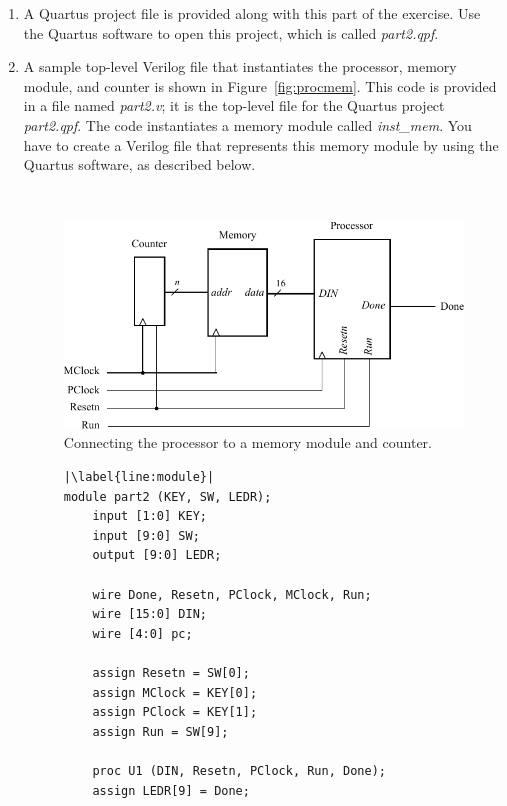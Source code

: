 \documentclass[epsfig,10pt,fullpage]{article}
\begin{document}
\begin{enumerate}
\item A Quartus project file is provided along with this part of the exercise.  Use the 
Quartus software to open this project, which is called {\it part2.qpf}.
\item A sample top-level Verilog file that instantiates the processor, memory module, and
counter is shown in Figure~\ref{fig:procmem}. This code is provided in a file named
{\it part2.v}; it is the top-level file for the Quartus project {\it part2.qpf}. The 
code instantiates a memory module called {\it inst\_mem}. You have to create a Verilog file
that represents this memory module by using the Quartus software, as described below.

~\\
\begin{figure}[H]
	\begin{center}
		\includegraphics[]{figures/figure4.pdf}
	\end{center}
	\caption{Connecting the processor to a memory module and counter.}
	\label{fig:fig4}
\end{figure}
\newpage
\lstset{language=Verilog,numbers=none,escapechar=|}
\begin{figure}[h]
\begin{center}
\begin{minipage}[t]{12.5 cm}
\begin{lstlisting}[name=proc]
|\label{line:module}|
module part2 (KEY, SW, LEDR);
    input [1:0] KEY;
    input [9:0] SW;
    output [9:0] LEDR;	

    wire Done, Resetn, PClock, MClock, Run;
    wire [15:0] DIN;
    wire [4:0] pc;

    assign Resetn = SW[0];
    assign MClock = KEY[0];
    assign PClock = KEY[1];
    assign Run = SW[9];

    proc U1 (DIN, Resetn, PClock, Run, Done);
    assign LEDR[9] = Done;


\end{lstlisting}
\end{minipage}
\end{center}
\end{figure}
\end{enumerate}
\end{document}
